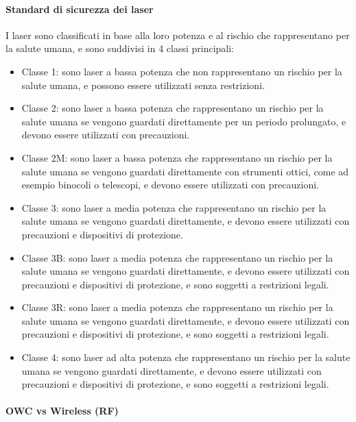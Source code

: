 \paragraph{Standard di sicurezza dei laser}
I laser sono classificati in base alla loro potenza e al rischio che rappresentano per la salute umana, e sono suddivisi in 4 classi principali:
\begin{itemize}
    \item Classe 1: sono laser a bassa potenza che non rappresentano un rischio per la salute umana, e possono essere utilizzati senza restrizioni.\\
    \item Classe 2: sono laser a bassa potenza che rappresentano un rischio per la salute umana se vengono guardati direttamente per un periodo prolungato, e devono essere utilizzati con precauzioni.\\
    \item Classe 2M: sono laser a bassa potenza che rappresentano un rischio per la salute umana se vengono guardati direttamente con strumenti ottici, come ad esempio binocoli o telescopi, e devono essere utilizzati con precauzioni.\\
    \item Classe 3: sono laser a media potenza che rappresentano un rischio per la salute umana se vengono guardati direttamente, e devono essere utilizzati con precauzioni e dispositivi di protezione.\\
    \item Classe 3B: sono laser a media potenza che rappresentano un rischio per la salute umana se vengono guardati direttamente, e devono essere utilizzati con precauzioni e dispositivi di protezione, e sono soggetti a restrizioni legali.\\
    \item Classe 3R: sono laser a media potenza che rappresentano un rischio per la salute umana se vengono guardati direttamente, e devono essere utilizzati con precauzioni e dispositivi di protezione, e sono soggetti a restrizioni legali.\\
    \item Classe 4: sono laser ad alta potenza che rappresentano un rischio per la salute umana se vengono guardati direttamente, e devono essere utilizzati con precauzioni e dispositivi di protezione, e sono soggetti a restrizioni legali.\\
\end{itemize}

\paragraph{OWC vs Wireless (RF)}

